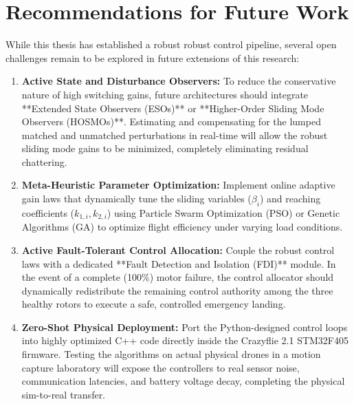 \section{Recommendations for Future Work}
While this thesis has established a robust robust control pipeline, several open challenges remain to be explored in future extensions of this research:
\begin{enumerate}
    \item \textbf{Active State and Disturbance Observers:} To reduce the conservative nature of high switching gains, future architectures should integrate **Extended State Observers (ESOs)** or **Higher-Order Sliding Mode Observers (HOSMOs)**. Estimating and compensating for the lumped matched and unmatched perturbations in real-time will allow the robust sliding mode gains to be minimized, completely eliminating residual chattering.
    \item \textbf{Meta-Heuristic Parameter Optimization:} Implement online adaptive gain laws that dynamically tune the sliding variables ($\beta_i$) and reaching coefficients ($k_{1,i}, k_{2,i}$) using Particle Swarm Optimization (PSO) or Genetic Algorithms (GA) to optimize flight efficiency under varying load conditions.
    \item \textbf{Active Fault-Tolerant Control Allocation:} Couple the robust control laws with a dedicated **Fault Detection and Isolation (FDI)** module. In the event of a complete (100\%) motor failure, the control allocator should dynamically redistribute the remaining control authority among the three healthy rotors to execute a safe, controlled emergency landing.
    \item \textbf{Zero-Shot Physical Deployment:} Port the Python-designed control loops into highly optimized C++ code directly inside the Crazyflie 2.1 STM32F405 firmware. Testing the algorithms on actual physical drones in a motion capture laboratory will expose the controllers to real sensor noise, communication latencies, and battery voltage decay, completing the physical sim-to-real transfer.
\end{enumerate}